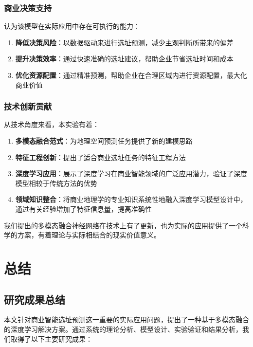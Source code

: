 \documentclass{article}
\begin{document}
\subsubsection{商业决策支持}

认为该模型在实际应用中存在可执行的能力：

\begin{enumerate}
\item \textbf{降低决策风险}：以数据驱动来进行选址预测，减少主观判断所带来的偏差
\item \textbf{提升决策效率}：通过快速准确的选址建议，帮助企业节省选址时间和成本
\item \textbf{优化资源配置}：通过精准预测，帮助企业在合理区域内进行资源配置，最大化商业价值
\end{enumerate}

\subsubsection{技术创新贡献}

从技术角度来看，本实验有着：

\begin{enumerate}
\item \textbf{多模态融合范式}：为地理空间预测任务提供了新的建模思路
\item \textbf{特征工程创新}：提出了适合商业选址任务的特征工程方法
\item \textbf{深度学习应用}：展示了深度学习在商业智能领域的广泛应用潜力，验证了深度模型相较于传统方法的优势
\item \textbf{领域知识整合}：将商业地理学的专业知识系统性地融入深度学习模型设计中，通过有关经验增加了特征信息量，提高准确性
\end{enumerate}

我们提出的多模态融合神经网络在技术上有了更新，也为实际的应用提供了一个科学的方案，有着理论与实际相结合的现实价值意义。

\section{总结}

\subsection{研究成果总结}

本文针对商业智能选址预测这一重要的实际应用问题，提出了一种基于多模态融合的深度学习解决方案。通过系统的理论分析、模型设计、实验验证和结果分析，我们取得了以下主要研究成果：
\end{document}
